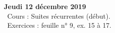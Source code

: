 \documentclass[12pt,a4paper]{article}
\begin{document}
%  
%  
%  
% 
%  
%  
% 

\noindent\textbf{Jeudi 12 décembre 2019}\\
\bu\ Cours : Suites récurrentes (début).\\
\bu\ Exercices : feuille n° 9, ex. 15 à 17.\vspace{.4cm}\\ 
 
\end{document}
